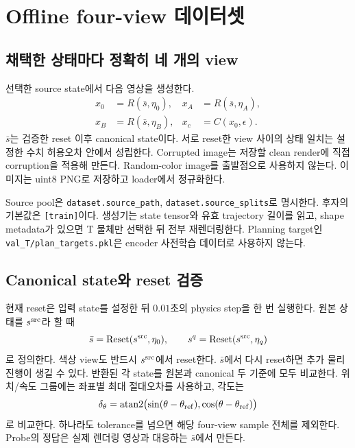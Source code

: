 \documentclass[11pt,a4paper]{article}
\newcommand{\code}[1]{\nolinkurl{#1}}
\begin{document}
\section{Offline four-view 데이터셋}
\subsection{채택한 상태마다 정확히 네 개의 view}
선택한 source state에서 다음 영상을 생성한다.
\begin{align}
x_0&=R(\bar{s},\eta_0), & x_A&=R(\bar{s},\eta_A),\\
x_B&=R(\bar{s},\eta_B), & x_c&=C(x_0,\epsilon).
\end{align}
$\bar{s}$는 검증한 reset 이후 canonical state이다. 서로 reset한 view 사이의
상태 일치는 설정한 수치 허용오차 안에서 성립한다. Corrupted image는 저장할
clean render에 직접 corruption을 적용해 만든다. Random-color image를 출발점으로
사용하지 않는다. 이미지는 uint8 PNG로 저장하고 loader에서 정규화한다.

Source pool은 \code{dataset.source_path}, \code{dataset.source_splits}로
명시한다. 후자의 기본값은 \code{[train]}이다. 생성기는 state tensor와 유효
trajectory 길이를 읽고, shape metadata가 있으면 T 물체만 선택한 뒤 전부
재렌더링한다. Planning target인 \code{val_T/plan_targets.pkl}은 encoder
사전학습 데이터로 사용하지 않는다.

\subsection{Canonical state와 reset 검증}
현재 reset은 입력 state를 설정한 뒤 $0.01$초의 physics step을 한 번 실행한다.
원본 상태를 $s^{\rm src}$라 할 때
\begin{equation}
\bar{s}=\operatorname{Reset}(s^{\rm src},\eta_0),\qquad
s^q=\operatorname{Reset}(s^{\rm src},\eta_q)
\end{equation}
로 정의한다. 색상 view도 반드시 $s^{\rm src}$에서 reset한다. $\bar{s}$에서
다시 reset하면 추가 물리 진행이 생길 수 있다.
반환된 각 state를 원본과 canonical 두 기준에 모두 비교한다.
위치/속도 그룹에는 좌표별 최대 절대오차를 사용하고, 각도는
\begin{equation}
\delta_\theta=\operatorname{atan2}\bigl(\sin(\theta-\theta_{\rm ref}),
\cos(\theta-\theta_{\rm ref})\bigr)
\end{equation}
로 비교한다. 하나라도 tolerance를 넘으면 해당 four-view sample 전체를 제외한다.
Probe의 정답은 실제 렌더링 영상과 대응하는 $\bar{s}$에서 만든다.
\end{document}
